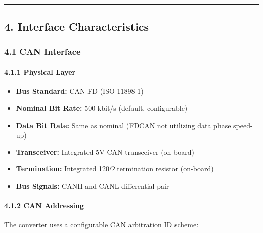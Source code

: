 \documentclass[
  11pt,
]{article}
\providecommand{\tightlist}{%
  \setlength{\itemsep}{0pt}\setlength{\parskip}{0pt}}
\begin{document}
\begin{center}\rule{0.5\linewidth}{0.5pt}\end{center}

\subsection{4. Interface
Characteristics}\label{interface-characteristics}

\subsubsection{4.1 CAN Interface}\label{can-interface}

\paragraph{4.1.1 Physical Layer}\label{physical-layer}

\begin{itemize}
\tightlist
\item
  \textbf{Bus Standard:} CAN FD (ISO 11898-1)
\item
  \textbf{Nominal Bit Rate:} 500 kbit/s (default, configurable)
\item
  \textbf{Data Bit Rate:} Same as nominal (FDCAN not utilizing data
  phase speed-up)
\item
  \textbf{Transceiver:} Integrated 5V CAN transceiver (on-board)
\item
  \textbf{Termination:} Integrated 120$\Omega$ termination resistor (on-board)
\item
  \textbf{Bus Signals:} CANH and CANL differential pair
\end{itemize}

\paragraph{4.1.2 CAN Addressing}\label{can-addressing}

The converter uses a configurable CAN arbitration ID scheme:
\end{document}
